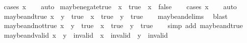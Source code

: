 \begin{isabellebody}
\endisadelimproof
%
\isatagproof
{}\isamarkupfalse%
\ {\isacharparenleft}cases\ x{\isacharparenright}\isanewline
\ \ \isamarkupfalse%
\ auto%
\endisatagproof
{\isafoldproof}%
%
\isadelimproof
\isanewline
%
\endisadelimproof
\isanewline
{}\isamarkupfalse%
\ maybe{\isacharunderscore}negate{\isacharunderscore}true{\isacharcolon}\ {\isachardoublequoteopen}{\isacharparenleft}{\isasymnot}\isactrlsub {\isacharquery}\ x\ {\isacharequal}\ true{\isacharparenright}\ {\isacharequal}\ {\isacharparenleft}x\ {\isacharequal}\ false{\isacharparenright}{\isachardoublequoteclose}\isanewline
%
\isadelimproof
\ \ %
\endisadelimproof
%
\isatagproof
{}\isamarkupfalse%
\ {\isacharparenleft}cases\ x{\isacharparenright}\isanewline
\ \ \isamarkupfalse%
\ auto%
\endisatagproof
{\isafoldproof}%
%
\isadelimproof
\isanewline
%
\endisadelimproof
\isanewline
{}\isamarkupfalse%
\ maybe{\isacharunderscore}and{\isacharunderscore}true{\isacharcolon}\ {\isachardoublequoteopen}{\isacharparenleft}x\ {\isasymand}\isactrlsub {\isacharquery}\ y\ {\isacharequal}\ true{\isacharparenright}\ {\isacharequal}\ {\isacharparenleft}x\ {\isacharequal}\ true\ {\isasymand}\ y\ {\isacharequal}\ true{\isacharparenright}{\isachardoublequoteclose}\isanewline
%
\isadelimproof
\ \ %
\endisadelimproof
%
\isatagproof
{}\isamarkupfalse%
\ maybe{\isacharunderscore}and{\isachardot}elims\ \isamarkupfalse%
\ blast%
\endisatagproof
{\isafoldproof}%
%
\isadelimproof
\isanewline
%
\endisadelimproof
\isanewline
{}\isamarkupfalse%
\ maybe{\isacharunderscore}and{\isacharunderscore}not{\isacharunderscore}true{\isacharcolon}\ {\isachardoublequoteopen}{\isacharparenleft}x\ {\isasymand}\isactrlsub {\isacharquery}\ y\ {\isasymnoteq}\ true{\isacharparenright}\ {\isacharequal}\ {\isacharparenleft}x\ {\isasymnoteq}\ true\ {\isasymor}\ y\ {\isasymnoteq}\ true{\isacharparenright}{\isachardoublequoteclose}\isanewline
%
\isadelimproof
\ \ %
\endisadelimproof
%
\isatagproof
{}\isamarkupfalse%
\ {\isacharparenleft}simp\ add{\isacharcolon}\ maybe{\isacharunderscore}and{\isacharunderscore}true{\isacharparenright}%
\endisatagproof
{\isafoldproof}%
%
\isadelimproof
\isanewline
%
\endisadelimproof
\isanewline
{}\isamarkupfalse%
\ maybe{\isacharunderscore}and{\isacharunderscore}valid{\isacharcolon}\ {\isachardoublequoteopen}x\ {\isasymand}\isactrlsub {\isacharquery}\ y\ {\isasymnoteq}\ invalid\ {\isasymLongrightarrow}\ x\ {\isasymnoteq}\ invalid\ {\isasymand}\ y\ {\isasymnoteq}\ invalid{\isachardoublequoteclose}\isanewline

\end{isabellebody}
